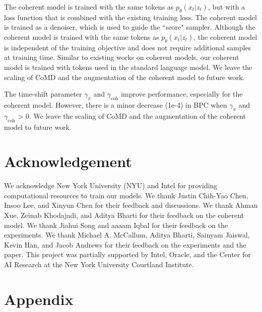 \documentclass{article} %
\begin{document}
The coherent model is trained with the same tokens as $p_\theta(x_t|z_t)$, but with a loss function that is combined with the existing training loss. The coherent model is trained as a denoiser, which is used to guide the ``score" sampler. Although the coherent model is trained with the same tokens as $p_\theta(x_t|z_t)$, the coherent model is independent of the training objective and does not require additional samples at training time. Similar to existing works on coherent models, our coherent model is trained with tokens used in the standard language model. We leave the scaling of CoMD and the augmentation of the coherent model to future work. 

The time-shift parameter $\gamma_\pi$ and $\gamma_\mathrm{coh}$ improve performance, especially for the coherent model. However, there is a minor decrease (1e-4) in BPC when $\gamma_\pi$ and $\gamma_\mathrm{coh}$ > 0. We leave the scaling of CoMD and the augmentation of the coherent model to future work. 



\section{Acknowledgement}

We acknowledge New York University (NYU) and Intel for providing computational resources to train our models. We thank Justin Chih-Yao Chen, Insoo Lee, and Xinyun Chen for their feedback and discussions. We thank Ahman Xue, Zeinab Khodajadi, and Aditya Bharti for their feedback on the coherent model. We thank Jiahui Song and aaaam Iqbal for their feedback on the experiments. We thank Michael A. McCallum, Aditya Bharti, Sainyam Jaiswal, Kevin Han, and Jacob Andrews for their feedback on the experiments and the paper. This project was partially supported by Intel, Oracle, and the Center for AI Research at the New York University Courtland Institute. 






\appendix
\section{Appendix}
\end{document}
